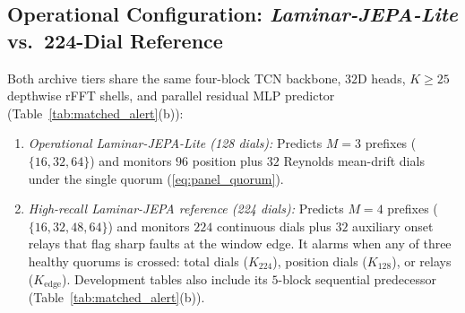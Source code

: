 \subsection{Operational Configuration: \emph{Laminar-JEPA-Lite} vs.\ 224-Dial Reference}
\label{subsec:laminar_lite}
Both archive tiers share the same four-block TCN backbone, $32$D heads, $K \ge 25$ depthwise rFFT shells, and parallel residual MLP predictor (Table~\ref{tab:matched_alert}(b)):
\begin{enumerate}[leftmargin=*,nosep,itemsep=1pt]
    \item \emph{Operational \emph{Laminar-JEPA-Lite} (128 dials):} Predicts $M=3$ prefixes ($\{16, 32, 64\}$) and monitors $96$ position plus $32$ Reynolds mean-drift dials under the single quorum (\ref{eq:panel_quorum}).
    \item \emph{High-recall \emph{Laminar-JEPA} reference (224 dials):} Predicts $M=4$ prefixes ($\{16, 32, 48, 64\}$) and monitors $224$ continuous dials plus $32$ auxiliary onset relays that flag sharp faults at the window edge. It alarms when any of three healthy quorums is crossed: total dials ($K_{224}$), position dials ($K_{128}$), or relays ($K_{\text{edge}}$). Development tables also include its $5$-block sequential predecessor (Table~\ref{tab:matched_alert}(b)).
\end{enumerate}

